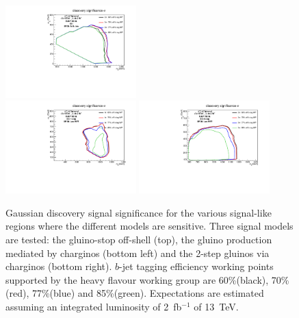\begin{figure}[htb!!]
\begin{center}
\includegraphics[width=0.45\textwidth]{FIGURES/BTAGGINGMC15/L2fb/plot_significance_gtt_CutSR3BS60_all.pdf}\\
\includegraphics[width=0.45\textwidth]{FIGURES/BTAGGINGMC15/L2fb/plot_significance_gg1step_CutSR0BL60_all.pdf}        
\includegraphics[width=0.45\textwidth]{FIGURES/BTAGGINGMC15/L2fb/plot_significance_gg2step_CutSR0BL60_all.pdf}          
\end{center}
\vspace{-0.2cm}
\caption{Gaussian discovery signal significance for the various signal-like regions where the different models are sensitive.
Three signal models are tested: the gluino-stop off-shell (top), the gluino production mediated by charginos (bottom left) and the 2-step gluinos via charginos (bottom right).
$b$-jet tagging efficiency working points supported by the heavy flavour working group are 60\%(black), 70\%(red), 77\%(blue) and 85\%(green).
Expectations are estimated assuming an integrated luminosity of 2~fb$^{-1}$ of 13~TeV.}
\label{fig:btaggingGrid}
\end{figure}

